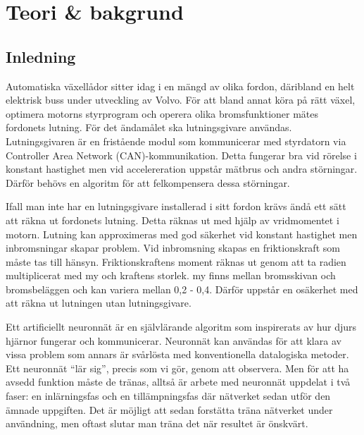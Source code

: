 \section{Teori \& bakgrund}
\subsection{Inledning}
Automatiska växellådor sitter idag i en mängd av olika fordon,
däribland en helt elektrisk buss under utveckling av Volvo.
För att bland annat köra på rätt växel, optimera motorns styrprogram
och operera olika bromsfunktioner %
mätes fordonets lutning.
För det ändamålet ska lutningsgivare användas.
Lutningsgivaren är en fristående modul som kommunicerar med styrdatorn via
Controller Area Network (CAN)-kommunikation.
Detta fungerar bra vid rörelse i konstant hastighet
men vid accelereration uppstår mätbrus och andra störningar.
Därför behövs en algoritm för att felkompensera dessa störningar.

Ifall man inte har en lutningsgivare installerad i sitt fordon krävs ändå ett
sätt att räkna ut fordonets lutning.
Detta räknas ut med hjälp av vridmomentet i motorn.
Lutning kan approximeras med god säkerhet vid konstant hastighet
men inbromsningar skapar problem.
Vid inbromsning skapas en friktionskraft
som måste tas till hänsyn.
Friktionskraftens moment räknas ut genom att ta
radien multiplicerat med my och kraftens storlek.
my finns mellan bromsskivan
och bromsbeläggen och kan variera mellan 0,2 - 0,4.
Därför uppstår en osäkerhet med att räkna ut lutningen utan lutningsgivare.

Ett artificiellt neuronnät är en självlärande algoritm som inspirerats av
hur djurs hjärnor fungerar och kommunicerar.
Neuronnät kan användas för att klara av vissa problem som annars är svårlösta
med konventionella datalogiska metoder.
Ett neuronnät ``lär sig'', precis som vi gör, genom att observera.
Men för att ha avsedd funktion måste de tränas, alltså är arbete med neuronnät
uppdelat i två faser: en inlärningsfas och en tillämpningsfas där nätverket sedan
utför den ämnade uppgiften.
\autocite{copeland16}
Det är möjligt att sedan forstätta träna nätverket
under användning, men oftast slutar man träna det när resultet är önskvärt.
\autocite{wiki-neuronnat}

